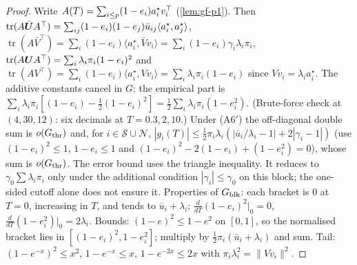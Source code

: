 \begin{proof}
Write $A(T)=\sum_{i\le p}(1-e_i)a_i^\star v_i^{\top}$ (\cref{lem:gf-p1}). Then $\operatorname{tr}(A\bar{\bm{U}} A^{\top})=\sum_{ij}(1-e_i)(1-e_j)\bar u_{ij}\langle a_i^\star,a_j^\star\rangle$, $\operatorname{tr}(A\bar V^{\top})=\sum_i(1-e_i)\langle a_i^\star,\bar Vv_i\rangle=\sum_i(1-e_i)\gamma_i\lambda_i\pi_i$, $\operatorname{tr}(A\bm{U} A^{\top})=\sum_i\lambda_i\pi_i(1-e_i)^2$ and $\operatorname{tr}(AV^{\top})=\sum_i(1-e_i)\langle a_i^\star,Vv_i\rangle=\sum_i\lambda_i\pi_i(1-e_i)$ since $Vv_i=\lambda_ia_i^\star$. The additive constants cancel in $G$; the empirical part is $\sum_i\lambda_i\pi_i[(1-e_i)-\tfrac12(1-e_i)^2]=\tfrac12\sum_i\lambda_i\pi_i(1-e_i^2)$. (Brute-force check at $(4,30,12)$: six decimals at $T=0.3,2,10$.) Under (A6$'$) the off-diagonal double sum is $o(G_{\rm thr})$ and, for $i\in\mathcal S\cup\mathcal N$, $|g_i(T)|\le\tfrac12\pi_i\lambda_i(|\bar u_i/\lambda_i-1|+2|\gamma_i-1|)$ (use $(1-e_i)^2\le1$, $1-e_i\le1$ and $(1-e_i)^2-2(1-e_i)+(1-e_i^2)=0$), whose sum is $o(G_{\rm thr})$. The error bound uses the triangle inequality. It reduces to $\gamma_0\sum\lambda_i\pi_i$ only under the additional condition $|\gamma_i|\le\gamma_0$ on this block; the one-sided cutoff alone does not ensure it. Properties of $G_{\rm blk}$: each bracket is $0$ at $T=0$, increasing in $T$, and tends to $\bar u_i+\lambda_i$; $\tfrac{d}{dT}(1-e_i)^2|_0=0$, $\tfrac{d}{dT}(1-e_i^2)|_0=2\lambda_i$. Bounds: $(1-e)^2\le1-e^2$ on $[0,1]$, so the normalised bracket lies in $[(1-e_i)^2,1-e_i^2]$; multiply by $\tfrac12\pi_i(\bar u_i+\lambda_i)$ and sum. Tail: $(1-e^{-x})^2\le x^2$, $1-e^{-x}\le x$, $1-e^{-2x}\le2x$ with $\pi_i\lambda_i^2=\|Vv_i\|^2$.
\end{proof}

